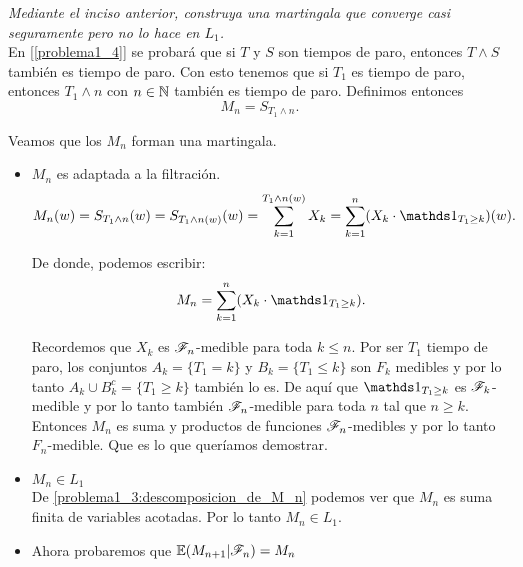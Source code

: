 \emph
{	
	Mediante el inciso anterior, construya una martingala que converge 
	casi seguramente pero no lo hace en $L_1$.\\
}
\afterstatement	
	En [\ref{problema1_4}] se probará que si $T$ y $S$ son tiempos de paro, entonces $T\wedge S$ también 
	es tiempo de paro. Con esto tenemos que si $T_1$ es tiempo de paro, entonces $T_1 \wedge n$ con 
	$n \in \mathbb{N}$ también es tiempo de paro. Definimos entonces 
	$$M_n = S_{T_1 \wedge n}.$$
	
	Veamos que los $M_n$ forman una martingala.
	
	\begin{itemize}
		\item 
			$M_n$ es adaptada a la filtración.
			\begin{align}
				M_n(w) = S_{T_1 \wedge n}(w) = 
				S_{T_1 \wedge n (w)}(w) = 
				\sum_{k=1}^{T_1 \wedge n (w)} X_k = 
				\sum_{k=1}^{n} (X_k \cdot \indic_{T_1 \geq k})(w).
			\end{align}
			
			De donde, podemos escribir:
			\begin{align}\label{problema1_3:descomposicion_de_M_n}
				M_n = \sum_{k=1}^{n} (X_k \cdot \indic_{T_1 \geq k}).
			\end{align}								 		
			
			Recordemos que $X_k$ es $\mathscr{F}_n$-medible para toda $k \leq n $. Por ser
			$T_1$ tiempo de paro, los conjuntos $A_k = \{T_1 = k\}$ y 
			$B_k = \{T_1 \leq k\}$	son $F_k$ medibles y por lo tanto 
			$A_k \cup B_k^c = \{ T_1 \geq k\}$ también lo es. De aquí que 
			$\indic_{T_1 \geq k}$ es $\mathscr{F}_k$-medible y por lo tanto también $\mathscr{F}_n$-medible
			para toda $n$ tal que $n \geq k$.\\
			  
			Entonces $M_n$ es suma y productos de funciones $\mathscr{F}_n$-medibles y por lo tanto
			$F_n$-medible. Que es lo que queríamos demostrar.\\
			
		\item
			$M_n \in L_1$\\
			
			De \eqref{problema1_3:descomposicion_de_M_n} podemos ver que $M_n$ es 
			suma finita de variables acotadas. Por lo tanto $M_n \in L_1$.\\
			
		\item Ahora probaremos que	$\mathbb{E}(M_{n+1} | \mathscr{F}_{n}) = M_{n}$\\
			

\end{itemize}
